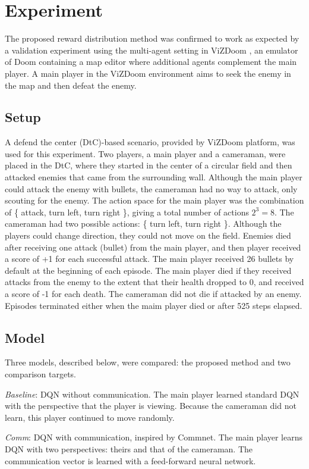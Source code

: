 \section{Experiment}
The proposed reward distribution method was confirmed to work as expected by a validation experiment using the multi-agent setting in ViZDoom \citep{kempka2016vizdoom}, 
an emulator of Doom containing a map editor where additional agents complement the main player.
A main player in the ViZDoom environment aims to seek the enemy in the map and then defeat the enemy.

\subsection{Setup}
A defend the center (DtC)-based scenario, provided by ViZDoom platform, was used for this experiment.
Two players, a main player and a cameraman, were placed in the DtC, where they started in the center of a circular field and then attacked enemies that came from the surrounding wall.
Although the main player could attack the enemy with bullets, 
the cameraman had no way to attack, only scouting for the enemy.
The action space for the main player was the combination of \{ attack, turn left, turn right \}, giving a total number of actions $2^3 = 8$.
The cameraman had two possible actions: \{ turn left, turn right \}.
Although the players could change direction, they could not move on the field.
Enemies died after receiving one attack (bullet) from the main player, and then player received a score of +1 for each successful attack.
The main player received 26 bullets by default at the beginning of each episode.
The main player died if they received attacks from the enemy to the extent that their health dropped to 0, and received a score of -1 for each death.
The cameraman did not die if attacked by an enemy.
Episodes terminated either when the maim player died or after 525 steps elapsed.

\subsection{Model}
Three models, described below, were compared: the proposed method and two comparison targets.

{\em Baseline}: DQN without communication. The main player learned standard DQN with the perspective that the player is viewing.
Because the cameraman did not learn, this player continued to move randomly.

{\em Comm}: DQN with communication, inspired by Commnet. The main player learns DQN with two perspectives: theirs and that of the cameraman.
The communication vector is learned with a feed-forward neural network.

